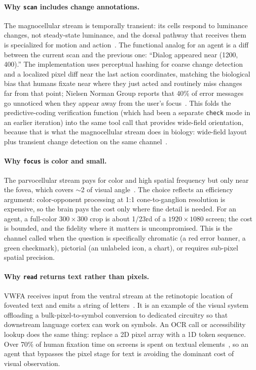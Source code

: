 \documentclass[11pt,a4paper]{article}
\begin{document}
\paragraph{Why \texttt{scan} includes change annotations.}
The magnocellular stream is temporally transient: its cells respond to
luminance changes, not steady-state luminance, and the dorsal pathway that
receives them is specialized for motion and
action~\cite{livingstone-hubel-segregation,goodale1992separate}. The
functional analog for an agent is a diff between the current scan and the
previous one: ``Dialog appeared near (1200, 400).'' The implementation uses
perceptual hashing for coarse change detection and a localized pixel diff
near the last action coordinates, matching the biological bias that humans
fixate near where they just acted and routinely miss changes far from that
point; Nielsen Norman Group reports that 40\% of error messages go unnoticed
when they appear away from the user's focus~\cite{gui-eye-tracking,nngroup-change-blindness}.
This folds the predictive-coding verification function (which had been a
separate \texttt{check} mode in an earlier iteration) into the same tool call
that provides wide-field orientation, because that is what the magnocellular
stream does in biology: wide-field layout plus transient change detection on
the same channel~\cite{rao-ballard-1999,friston2005theory,keller2018predictive}.

\paragraph{Why \texttt{focus} is color and small.}
The parvocellular stream pays for color and high spatial frequency but only
near the fovea, which covers $\sim$2\textdegree{} of visual
angle~\cite{wandell2007visual}. The choice reflects an efficiency argument:
color-opponent processing at 1:1 cone-to-ganglion resolution is expensive, so
the brain pays the cost only where fine detail is needed. For an agent, a
full-color $300 \times 300$ crop is about 1/23rd of a $1920 \times 1080$
screen; the cost is bounded, and the fidelity where it matters is
uncompromised. This is the channel called when the question is specifically
chromatic (a red error banner, a green checkmark), pictorial (an unlabeled
icon, a chart), or requires sub-pixel spatial precision.

\paragraph{Why \texttt{read} returns text rather than pixels.}
VWFA receives input from the ventral stream at the retinotopic location of
foveated text and emits a string of letters~\cite{dehaene-cohen-vwfa}. It is
an example of the visual system offloading a bulk-pixel-to-symbol conversion
to dedicated circuitry so that downstream language cortex can work on
symbols. An OCR call or accessibility lookup does the same thing: replace a
2D pixel array with a 1D token sequence. Over 70\% of human fixation time on
screens is spent on textual elements~\cite{rayner-eye-movements}, so an agent
that bypasses the pixel stage for text is avoiding the dominant cost of
visual observation.
\end{document}

